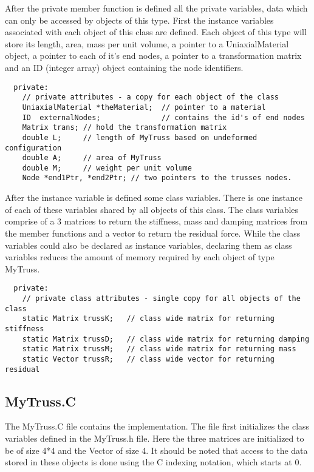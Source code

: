 \documentclass[12pt]{article}
\begin{document}
After the private member function is defined all the private
variables, data which can only be accessed by objects of this
type. First the instance variables associated with each object of this
class are defined. Each object of this type will store its length,
area, mass per unit volume, a pointer to a UniaxialMaterial object, 
a pointer to each of it's end nodes, a pointer to a transformation matrix and an ID
(integer array) object containing the node identifiers. 

{\sf\small \begin{verbatim}    
  private:
    // private attributes - a copy for each object of the class
    UniaxialMaterial *theMaterial;  // pointer to a material
    ID  externalNodes;              // contains the id's of end nodes
    Matrix trans; // hold the transformation matrix
    double L;     // length of MyTruss based on undeformed configuration
    double A; 	  // area of MyTruss
    double M; 	  // weight per unit volume
    Node *end1Ptr, *end2Ptr; // two pointers to the trusses nodes.
\end{verbatim} }

After the instance variable is defined some class variables. There is
one instance of each of these variables shared by all objects
of this class. The class variables comprise of a 3 matrices to return the
stiffness, mass and damping matrices from the member functions and a
vector to return the residual force. While the class variables could
also be declared as instance variables, declaring them as class
variables reduces the amount of memory required by each object of type
MyTruss. 

{\sf\small \begin{verbatim}
  private:
    // private class attributes - single copy for all objects of the class
    static Matrix trussK;   // class wide matrix for returning stiffness
    static Matrix trussD;   // class wide matrix for returning damping
    static Matrix trussM;   // class wide matrix for returning mass 
    static Vector trussR;   // class wide vector for returning residual
\end{verbatim} }

\subsection {\sf MyTruss.C}
The {\sf MyTruss.C} file contains the implementation. The file first
initializes the class variables defined in the {\sf MyTruss.h}
file. Here the three matrices are initialized to be of size 4*4 and
the Vector of size 4. It should be noted that access to the data
stored in these objects is done using the C indexing notation, which
starts at 0.
\end{document}
